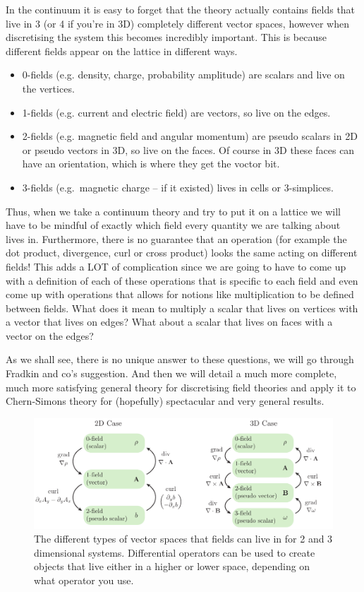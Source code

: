 \documentclass[11pt, oneside]{article} %
\numberwithin{equation}{section}
\begin{document}
In the continuum it is easy to forget that the theory actually contains fields that live in 3 (or 4 if you're in 3D) completely different vector spaces, however when discretising the system this becomes incredibly important. This is because different fields appear on the lattice in different ways.
\begin{itemize}
    \item 0-fields (e.g. density, charge, probability amplitude) are scalars and live on the vertices.
    \item 1-fields (e.g. current and electric field) are vectors, so live on the edges.
    \item 2-fields (e.g. magnetic field and angular momentum) are pseudo scalars in 2D or pseudo vectors in 3D, so live on the faces. Of course in 3D these faces can have an orientation, which is where they get the voctor bit.
    \item 3-fields (e.g.~magnetic charge -- if it existed) lives in cells or 3-simplices.
\end{itemize}
Thus, when we take a continuum theory and try to put it on a lattice we will have to be mindful of exactly which field every quantity we are talking about lives in. Furthermore, there is no guarantee that an operation (for example the dot product, divergence, curl or cross product) looks the same acting on different fields! This adds a LOT of complication since we are going to have to come up with a definition of each of these operations that is specific to each field and even come up with operations that allows for notions like multiplication to be defined between fields. What does it mean to multiply a scalar that lives on vertices with a vector that lives on edges? What about a scalar that lives on faces with a vector on the edges? 

As we shall see, there is no unique answer to these questions, we will go through Fradkin and co's suggestion. And then we will detail a much more complete, much more satisfying general theory for discretising field theories and apply it to Chern-Simons theory for (hopefully) spectacular and very general results. 


\begin{figure}
    \centering
    \includegraphics[width=1\linewidth]{figs/maps_to_forms.pdf}
    \caption{The different types of vector spaces that fields can live in for 2 and 3 dimensional systems. Differential operators can be used to create objects that live either in a higher or lower space, depending on what operator you use. }
    \label{fig:maps_to_forms}
\end{figure}
\end{document}
